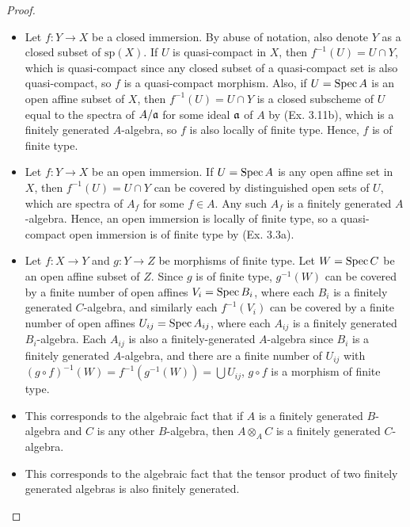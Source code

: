\documentclass[a4paper]{article}
\begin{document}
\begin{enumerate} [label=\textbf{\arabic*.}, leftmargin=0em]
          \begin{proof} $ $ \vspace{0pt}
              \begin{itemize} [leftmargin=0cm]
                  \item[(a)] Let $f : Y \to X$ be a closed immersion. By abuse of notation, also denote $Y$ as a closed subset of $\text{sp}(X)$. If $U$ is quasi-compact in $X$, then $f^{-1}(U) = U \cap Y$, which is quasi-compact since any closed subset of a quasi-compact set is also quasi-compact, so $f$ is a quasi-compact morphism. Also, if $U = \operatorname{Spec}{A}$ is an open affine subset of $X$, then $f^{-1}(U) = U \cap Y$ is a closed subscheme of $U$ equal to the spectra of $A/ \mathfrak{a}$ for some ideal $\mathfrak{a}$ of $A$ by (Ex. 3.11b), which is a finitely generated $A$-algebra, so $f$ is also locally of finite type. Hence, $f$ is of finite type.

                  \item[(b)] Let $f : Y \to X$ be an open immersion. If $U = \operatorname{Spec}{A}$ is any open affine set in $X$, then $f^{-1}(U) = U \cap Y$ can be covered by distinguished open sets of $U$, which are spectra of $A_f$ for some $f \in A$. Any such $A_f$ is a finitely generated $A$-algebra. Hence, an open immersion is locally of finite type, so a quasi-compact open immersion is of finite type by (Ex. 3.3a).

                  \item[(c)] Let $f : X \to Y$ and $g : Y \to Z$ be morphisms of finite type. Let $W = \operatorname{Spec}{C}$ be an open affine subset of $Z$. Since $g$ is of finite type, $g^{-1}(W)$ can be covered by a finite number of open affines $V_i = \operatorname{Spec}{B_i}$, where each $B_i$ is a finitely generated $C$-algebra, and similarly each $f^{-1}(V_i)$ can be covered by a finite number of open affines $U_{ij} = \operatorname{Spec}{A_{ij}}$, where each $A_{ij}$ is a finitely generated $B_i$-algebra. Each $A_{ij}$ is also a finitely-generated $A$-algebra since $B_i$ is a finitely generated $A$-algebra, and there are a finite number of $U_{ij}$ with $(g \circ f)^{-1}(W) = f^{-1}(g^{-1}(W)) = \bigcup U_{ij}$, $g \circ f$ is a morphism of finite type.

                  \item[(d)] This corresponds to the algebraic fact that if $A$ is a finitely generated $B$-algebra and $C$ is any other $B$-algebra, then $A \otimes_A C$ is a finitely generated $C$-algebra.

                  \item[(e)] This corresponds to the algebraic fact that the tensor product of two finitely generated algebras is also finitely generated.


\end{itemize}
\end{proof}
\end{enumerate}
\end{document}
